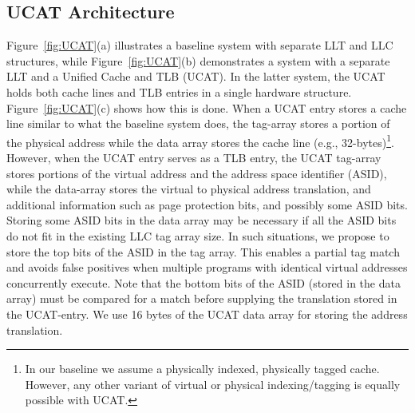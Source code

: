
\subsection{UCAT Architecture}

\noindent Figure~\ref{fig:UCAT}(a) illustrates a baseline system with
separate LLT and LLC structures, while Figure~\ref{fig:UCAT}(b)
demonstrates a system with a separate LLT and a Unified Cache and TLB
(UCAT). In the latter system, the UCAT holds both cache lines and TLB
entries in a single hardware structure. Figure~\ref{fig:UCAT}(c) shows
how this is done. When a UCAT entry stores a cache line similar to
what the baseline system does, the tag-array stores a portion of the
physical address while the data array stores the cache line (e.g.,
32-bytes)\footnote{In our baseline we assume a physically indexed,
physically tagged cache. However, any other variant of virtual or
physical indexing/tagging is equally possible with UCAT.}. However,
when the UCAT entry serves as a TLB entry, the UCAT tag-array stores
portions of the virtual address and the address space identifier
(ASID), while the data-array stores the virtual to physical address
translation, and additional information such as page protection bits,
and possibly some ASID bits. Storing some ASID bits in the data array
may be necessary if all the ASID bits do not fit in the existing LLC
tag array size. In such situations, we propose to store the top bits
of the ASID in the tag array. This enables a partial tag match and
avoids false positives when multiple programs with identical virtual
addresses concurrently execute. Note that the bottom bits of the ASID
(stored in the data array) must be compared for a match before
supplying the translation stored in the UCAT-entry. We use 16 bytes of
the UCAT data array for storing the address translation.

